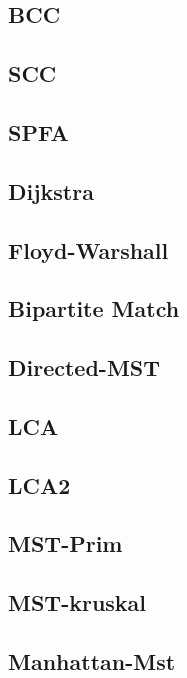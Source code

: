 \documentclass[a4paper,10pt,twocolumn,oneside]{article}
\begin{document}
\subsection{BCC}

\subsection{SCC}

\subsection{SPFA}

\subsection{Dijkstra}

\subsection{Floyd-Warshall}

\subsection{Bipartite Match}

\subsection{Directed-MST}

\subsection{LCA}

\subsection{LCA2}

\subsection{MST-Prim}

\subsection{MST-kruskal}

\subsection{Manhattan-Mst}

\end{document}
